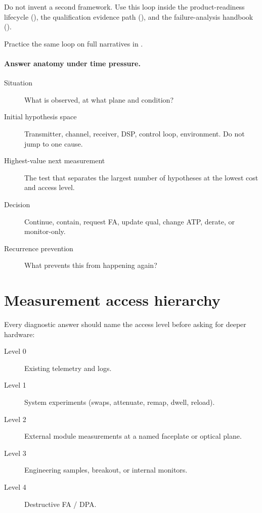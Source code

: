 Do not invent a second framework. Use this loop inside the product-readiness
lifecycle (), the qualification evidence path
(), and the failure-analysis handbook
().


Practice the same loop on full narratives in .

\paragraph{Answer anatomy under time pressure.}
\begin{description}
\item[Situation] What is observed, at what plane and condition?
\item[Initial hypothesis space] Transmitter, channel, receiver, DSP, control
      loop, environment. Do not jump to one cause.
\item[Highest-value next measurement] The test that separates the largest
      number of hypotheses at the lowest cost and access level.
\item[Decision] Continue, contain, request FA, update qual, change ATP, derate,
      or monitor-only.
\item[Recurrence prevention] What prevents this from happening again?
\end{description}

\section{Measurement access hierarchy}
\label{sec:interview-access-levels}

Every diagnostic answer should name the access level before asking for deeper
hardware:

\begin{description}
\item[Level 0] Existing telemetry and logs.
\item[Level 1] System experiments (swaps, attenuate, remap, dwell, reload).
\item[Level 2] External module measurements at a named faceplate or optical
      plane.
\item[Level 3] Engineering samples, breakout, or internal monitors.
\item[Level 4] Destructive FA / DPA.
\end{description}

